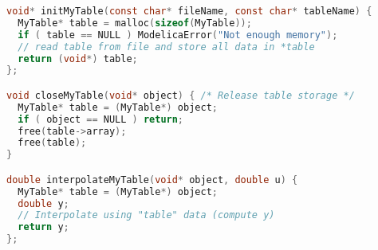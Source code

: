 \begin{example}
\begin{lstlisting}[language=C]
void* initMyTable(const char* fileName, const char* tableName) {
  MyTable* table = malloc(sizeof(MyTable));
  if ( table == NULL ) ModelicaError("Not enough memory");
  // read table from file and store all data in *table
  return (void*) table;
};

void closeMyTable(void* object) { /* Release table storage */
  MyTable* table = (MyTable*) object;
  if ( object == NULL ) return;
  free(table->array);
  free(table);
}

double interpolateMyTable(void* object, double u) {
  MyTable* table = (MyTable*) object;
  double y;
  // Interpolate using "table" data (compute y)
  return y;
};
\end{lstlisting}
\end{example}
